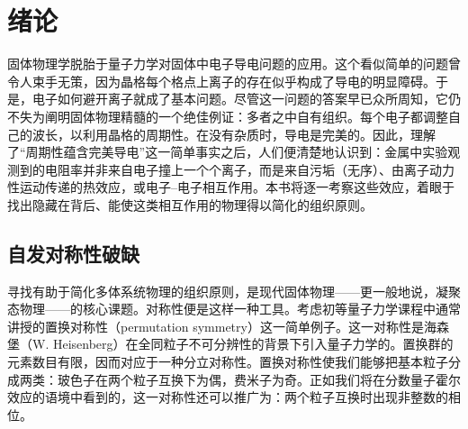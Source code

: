 \chapter{绪论}

固体物理学脱胎于量子力学对固体中电子导电问题的应用。这个看似简单的问题曾令人束手无策，因为晶格每个格点上离子的存在似乎构成了导电的明显障碍。于是，电子如何避开离子就成了基本问题。尽管这一问题的答案早已众所周知，它仍不失为阐明固体物理精髓的一个绝佳例证：多者之中自有组织。每个电子都调整自己的波长，以利用晶格的周期性。在没有杂质时，导电是完美的。因此，理解了“周期性蕴含完美导电”这一简单事实之后，人们便清楚地认识到：金属中实验观测到的电阻率并非来自电子撞上一个个离子，而是来自污垢（无序）、由离子动力性运动传递的热效应，或电子–电子相互作用。本书将逐一考察这些效应，着眼于找出隐藏在背后、能使这类相互作用的物理得以简化的组织原则。

\section{自发对称性破缺}

寻找有助于简化多体系统物理的组织原则，是现代固体物理——更一般地说，凝聚态物理——的核心课题。对称性便是这样一种工具。考虑初等量子力学课程中通常讲授的置换对称性（permutation symmetry）这一简单例子。这一对称性是海森堡（W. Heisenberg）在全同粒子不可分辨性的背景下引入量子力学的。置换群的元素数目有限，因而对应于一种分立对称性。置换对称性使我们能够把基本粒子分成两类：玻色子在两个粒子互换下为偶，费米子为奇。正如我们将在分数量子霍尔效应的语境中看到的，这一对称性还可以推广为：两个粒子互换时出现非整数的相位。

